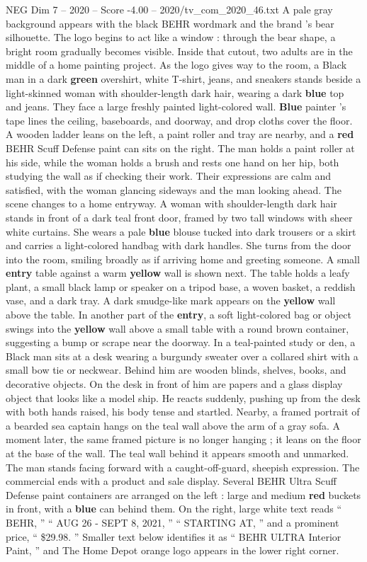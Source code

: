 \begin{textsample}{NEG Dim 7 – 2020 – Score -4.00 – 2020/tv\_com\_2020\_46.txt}  \label{ex:f7_neg_013}
A pale gray background appears with the black BEHR wordmark and the brand ’s bear silhouette.
The logo begins to act like a window : through the bear shape, a bright room gradually becomes visible.
Inside that cutout, two adults are in the middle of a home painting project.
As the logo gives way to the room, a Black man in a dark \textbf{green} overshirt, white T-shirt, jeans, and sneakers stands beside a light-skinned woman with shoulder-length dark hair, wearing a dark \textbf{blue} top and jeans.
They face a large freshly painted light-colored wall. \textbf{Blue} painter ’s tape lines the ceiling, baseboards, and doorway, and drop cloths cover the floor.
A wooden ladder leans on the left, a paint roller and tray are nearby, and a \textbf{red} BEHR Scuff Defense paint can sits on the right.
The man holds a paint roller at his side, while the woman holds a brush and rests one hand on her hip, both studying the wall as if checking their work.
Their expressions are calm and satisfied, with the woman glancing sideways and the man looking ahead.
The scene changes to a home entryway.
A woman with shoulder-length dark hair stands in front of a dark teal front door, framed by two tall windows with sheer white curtains.
She wears a pale \textbf{blue} blouse tucked into dark trousers or a skirt and carries a light-colored handbag with dark handles.
She turns from the door into the room, smiling broadly as if arriving home and greeting someone.
A small \textbf{entry} table against a warm \textbf{yellow} wall is shown next.
The table holds a leafy plant, a small black lamp or speaker on a tripod base, a woven basket, a reddish vase, and a dark tray.
A dark smudge-like mark appears on the \textbf{yellow} wall above the table.
In another part of the \textbf{entry}, a soft light-colored bag or object swings into the \textbf{yellow} wall above a small table with a round brown container, suggesting a bump or scrape near the doorway.
In a teal-painted study or den, a Black man sits at a desk wearing a burgundy sweater over a collared shirt with a small bow tie or neckwear.
Behind him are wooden blinds, shelves, books, and decorative objects.
On the desk in front of him are papers and a glass display object that looks like a model ship.
He reacts suddenly, pushing up from the desk with both hands raised, his body tense and startled.
Nearby, a framed portrait of a bearded sea captain hangs on the teal wall above the arm of a gray sofa.
A moment later, the same framed picture is no longer hanging ; it leans on the floor at the base of the wall.
The teal wall behind it appears smooth and unmarked.
The man stands facing forward with a caught-off-guard, sheepish expression.
The commercial ends with a product and sale display.
Several BEHR Ultra Scuff Defense paint containers are arranged on the left : large and medium \textbf{red} buckets in front, with a \textbf{blue} can behind them.
On the right, large white text reads “ BEHR, ” “ AUG 26 - SEPT 8, 2021, ” “ STARTING AT, ” and a prominent price, “ \$29.98. ” Smaller text below identifies it as “ BEHR ULTRA Interior Paint, ” and The Home Depot orange logo appears in the lower right corner.

\end{textsample}
